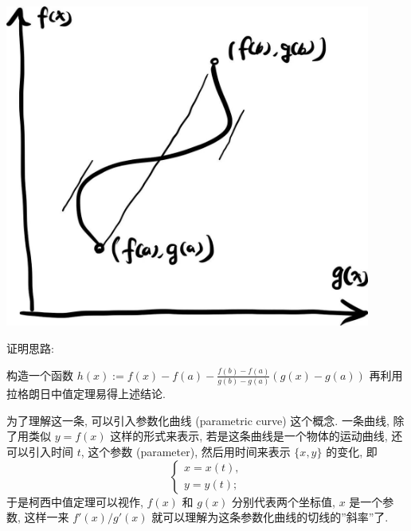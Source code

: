 \begin{tcolorbox}[size=fbox, breakable, enhanced jigsaw, title={洛必达法则 (L'Hôpital's
rule)}]
\begin{tcolorbox}[size=fbox, breakable, enhanced jigsaw, title={拉格朗日中值定理 (Lagrange mean value theorem)}]
\end{tcolorbox}

\begin{tcolorbox}[size=fbox, breakable, enhanced jigsaw, title={柯西中值定理 (Cauchy's mean value theorem)}]



\begin{tcolorbox}[size=fbox, breakable, enhanced jigsaw, sidebyside]
\includegraphics[width=0.9\textwidth]{img/image-20230615082658188.png}
\tcblower
{}
\end{tcolorbox}

\begin{newquote}
证明思路:

构造一个函数 $h(x):=f(x)-f(a)-\frac{f(b)-f(a)}{g(b)-g(a)}(g(x)-g(a))$
再利用拉格朗日中值定理易得上述结论.
\end{newquote}

为了理解这一条, 可以引入参数化曲线 (parametric curve) 这个概念.
一条曲线, 除了用类似 $y=f(x)$ 这样的形式来表示,
若是这条曲线是一个物体的运动曲线, 还可以引入时间 $t$, 这个参数
(parameter), 然后用时间来表示 $\{x,y\}$ 的变化, 即 \[
\begin{cases}
x=x(t),\\
y=y(t);
\end{cases}
\] 于是柯西中值定理可以视作, $f(x)$ 和 $g(x)$ 分别代表两个坐标值,
$x$ 是一个参数, 这样一来 $f'(x)/g'(x)$
就可以理解为这条参数化曲线的切线的''斜率''了.


\end{tcolorbox}
\end{tcolorbox}
